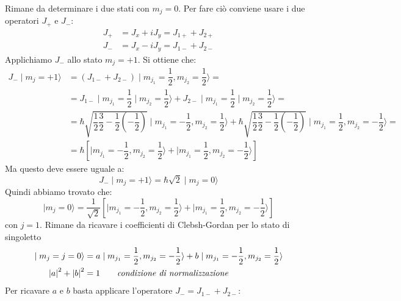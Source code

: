 Rimane da determinare i due stati con $m_{j} = 0$. Per fare ciò conviene usare 
i
due operatori $J_{+}$ e $J_{-}$:
\begin{align}
J_{+} &= J_{x} + iJ_{y} = J_{1+} + J_{2+} \\
J_{-} &= J_{x} - iJ_{y} = J_{1-} + J_{2-}
\end{align}
Applichiamo $J_{-}$ allo stato $m_{j} = +1$. Si ottiene che:
\begin{equation}
\begin{split}
J_{-}\mid m_{j} = +1 \rangle &= \left(J_{1-} + J_{2-}\right) \mid m_{j_{1}} = 
\dfrac{1}{2}, m_{j_{2}} = \dfrac{1}{2}\rangle = \\
&= J_{1-}  \mid m_{j_{1}} = \dfrac{1}{2}\mid m_{j_{2}} = \dfrac{1}{2}\rangle + 
J_{2-} \mid m_{j_{1}} = \dfrac{1}{2}\mid m_{j_{2}} = \dfrac{1}{2}\rangle = \\
&= \hbar \sqrt{\dfrac{1}{2}\dfrac{3}{2}-\dfrac{1}{2}\left(-\dfrac{1}{2}\right)} 
\mid m_{j_{1}} = -\dfrac{1}{2}, m_{j_{2}} = \dfrac{1}{2} \rangle + \hbar 
\sqrt{\dfrac{1}{2}\dfrac{3}{2}-\dfrac{1}{2}\left(-\dfrac{1}{2}\right)} \mid 
m_{j_{1}} = \dfrac{1}{2}, m_{j_{2}} = -\dfrac{1}{2} \rangle = \\
&= \hbar \left[ \mid m_{j_{1}} = -\dfrac{1}{2}, m_{j_{2}} = \dfrac{1}{2} 
\rangle + \mid m_{j_{1}} = \dfrac{1}{2}, m_{j_{2}} = -\dfrac{1}{2} \rangle 
\right]
\end{split}
\end{equation}
Ma questo deve essere uguale a:
\begin{equation}
J_{-} \mid m_{j} = +1 \rangle = \hbar \sqrt{2}\mid m_{j} = 0 \rangle
\end{equation}
Quindi abbiamo trovato che:
\begin{equation}
\mid m_{j} = 0 \rangle = \dfrac{1}{\sqrt{2}}\left[ \mid m_{j_{1}} = 
-\dfrac{1}{2}, m_{j_{2}} = \dfrac{1}{2} \rangle + \mid m_{j_{1}} = 
\dfrac{1}{2}, m_{j_{2}} = -\dfrac{1}{2}\rangle \right] 
\end{equation}
con $j=1$. 
\breaknote
Rimane da ricavare i coefficienti di Clebsh-Gordan per lo
stato di singoletto
\begin{align}
\mid m_{j} = j = 0 \rangle &= a \mid m_{j_{1}} = \dfrac{1}{2}, m_{j_{2}} = 
-\dfrac{1}{2} \rangle + b \mid m_{j_{1}} = -\dfrac{1}{2}, m_{j_{2}} = 
\dfrac{1}{2} \rangle \\
\left| a \right| ^{2} + \left| b \right| ^{2} &= 1  \quad \quad \text{\textit{condizione di 
normalizzazione}}
\end{align}
Per ricavare $a$ e $b$ basta applicare l'operatore $J_{-} = J_{1-} + J_{2-}$:
